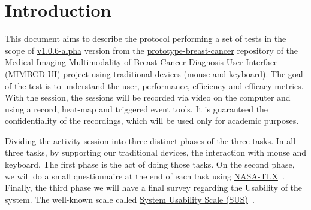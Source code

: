 
\section{Introduction}

This document aims to describe the protocol performing a set of tests in the scope of \hyperlink{https://github.com/MIMBCD-UI/prototype-breast-screening/releases/tag/v1.0.6-alpha}{v1.0.6-alpha} version from the \hyperlink{https://github.com/MIMBCD-UI/prototype-breast-cancer}{prototype-breast-cancer} repository of the \hyperlink{https://mimbcd-ui.github.io/}{Medical Imaging Multimodality of Breast Cancer Diagnosis User Interface (MIMBCD-UI)} project using traditional devices (mouse and keyboard). The goal of the test is to understand the user, performance, efficiency and efficacy metrics. With the session, the sessions will be recorded via video on the computer and using a record, heat-map and triggered event tools. It is guaranteed the confidentiality of the recordings, which will be used only for academic purposes.

Dividing the activity session into three distinct phases of the three tasks. In all three tasks, by supporting our traditional devices, the interaction with mouse and keyboard. The first phase is the act of doing those tasks. On the second phase, we will do a small questionnaire at the end of each task using \hyperlink{https://en.wikipedia.org/wiki/NASA-TLX}{NASA-TLX}~\cite{ramkumar2017using}. Finally, the third phase we will have a final survey regarding the Usability of the system. The well-known scale called \hyperlink{https, therefore, support this phase://en.wikipedia.org/wiki/System_usability_scale}{System Usability Scale (SUS)}~\cite{orfanou2015perceived}.